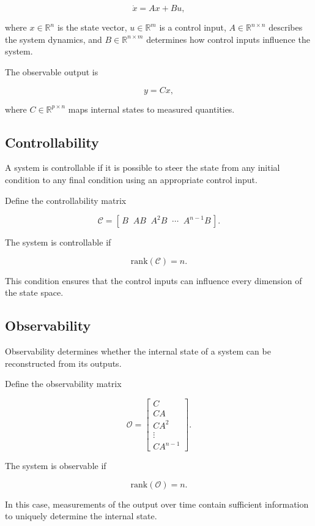 \documentclass[12pt]{article}
\begin{document}
\[
\dot{x} = Ax + Bu,
\]

where $x \in \mathbb{R}^n$ is the state vector, $u \in \mathbb{R}^m$ is a control input, $A \in \mathbb{R}^{n\times n}$ describes the system dynamics, and $B \in \mathbb{R}^{n\times m}$ determines how control inputs influence the system.

The observable output is

\[
y = Cx,
\]

where $C \in \mathbb{R}^{p\times n}$ maps internal states to measured quantities.

\subsection{Controllability}

A system is controllable if it is possible to steer the state from any initial condition to any final condition using an appropriate control input.

Define the controllability matrix

\[
\mathcal{C} = [\,B \;\; AB \;\; A^2B \;\; \cdots \;\; A^{n-1}B\,].
\]

The system is controllable if

\[
\mathrm{rank}(\mathcal{C}) = n.
\]

This condition ensures that the control inputs can influence every dimension of the state space.

\subsection{Observability}

Observability determines whether the internal state of a system can be reconstructed from its outputs.

Define the observability matrix

\[
\mathcal{O} =
\begin{bmatrix}
C\\
CA\\
CA^2\\
\vdots\\
CA^{n-1}
\end{bmatrix}.
\]

The system is observable if

\[
\mathrm{rank}(\mathcal{O}) = n.
\]

In this case, measurements of the output over time contain sufficient information to uniquely determine the internal state.
\end{document}
